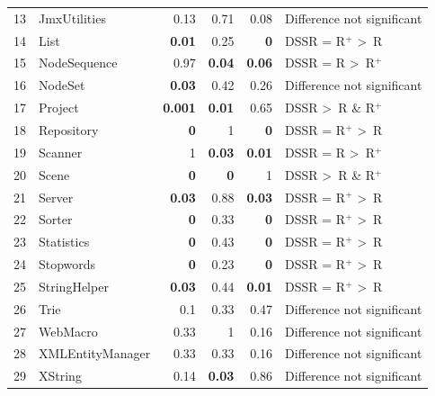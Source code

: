 \begin{table}[htp]
{\begin{tabular}{rlrrrl}
13		& 	JmxUtilities		&	0.13			& 0.71			& 0.08			& Difference not significant		\\

14		&	List				& 	\textbf{0.01}		&0.25			&\textbf{0}		& DSSR = R$^+$ \textgreater~R 		\\

15		&	NodeSequence	&	0.97			&\textbf{0.04}	&\textbf{0.06}	& DSSR = R \textgreater~R$^+$ 		\\

16		&	NodeSet			&	\textbf{0.03}		&0.42			&0.26			& Difference not significant		\\

17		&	Project			&	\textbf{0.001}	&\textbf{0.01}	&0.65			& DSSR \textgreater~R \& R$^+$  				\\		

18		&	Repository		&	\textbf{0}		&1				&\textbf{0}		& DSSR = R$^+$ \textgreater~R 		\\

19		&	Scanner			&	1				&\textbf{0.03}	&\textbf{0.01}	& DSSR = R \textgreater~R$^+$  				\\

20		&	Scene			&	\textbf{0}		&\textbf{0}		& 1				& DSSR \textgreater~R \& R$^+$  				\\

21		&	Server			&	\textbf{0.03}		& 0.88			&\textbf{0.03} 	& DSSR = R$^+$ \textgreater~R 		\\

22		&	Sorter			& 	\textbf{0}		& 0.33			&\textbf{0}		& DSSR = R$^+$ \textgreater~R 		\\

23		&	Statistics		&	\textbf{0}		& 0.43			&\textbf{0}		& DSSR = R$^+$ \textgreater~R 		\\

24		&	Stopwords		&	\textbf{0}		& 0.23			&\textbf{0}		& DSSR = R$^+$ \textgreater~R 		\\

25		&	StringHelper		&	\textbf{0.03}		& 0.44			&\textbf{0.01}	& DSSR = R$^+$ \textgreater~R		\\

26		& 	Trie				&	0.1				& 0.33			&0.47			& Difference not significant  				\\

27		&	WebMacro		&	0.33			& 1				&0.16			& Difference not significant		\\

28		&	XMLEntityManager&	0.33			& 0.33			&0.16			& Difference not significant		\\

29 		&	XString			&	0.14			&\textbf{0.03}	&0.86			& Difference not significant		\\


\end{tabular}
}
\bigskip
\label{table:ttest}
\end{table}

